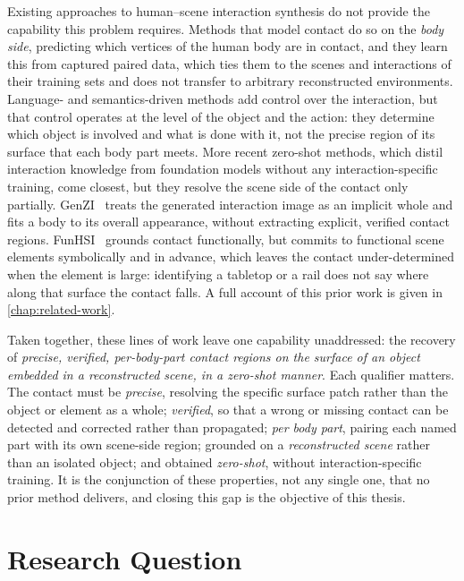 Existing approaches to human--scene interaction synthesis do not provide the capability this problem requires. Methods that model contact do so on the \emph{body side}, predicting which vertices of the human body are in contact, and they learn this from captured paired data, which ties them to the scenes and interactions of their training sets and does not transfer to arbitrary reconstructed environments. Language- and semantics-driven methods add control over the interaction, but that control operates at the level of the object and the action: they determine which object is involved and what is done with it, not the precise region of its surface that each body part meets. More recent zero-shot methods, which distil interaction knowledge from foundation models without any interaction-specific training, come closest, but they resolve the scene side of the contact only partially. GenZI~\cite{li2024genzi} treats the generated interaction image as an implicit whole and fits a body to its overall appearance, without extracting explicit, verified contact regions. FunHSI~\cite{liu2026funhsi} grounds contact functionally, but commits to functional scene elements symbolically and in advance, which leaves the contact under-determined when the element is large: identifying a tabletop or a rail does not say where along that surface the contact falls. A full account of this prior work is given in \cref{chap:related-work}.

Taken together, these lines of work leave one capability unaddressed: the recovery of \emph{precise, verified, per-body-part contact regions on the surface of an object embedded in a reconstructed scene, in a zero-shot manner}. Each qualifier matters. The contact must be \emph{precise}, resolving the specific surface patch rather than the object or element as a whole; \emph{verified}, so that a wrong or missing contact can be detected and corrected rather than propagated; \emph{per body part}, pairing each named part with its own scene-side region; grounded on a \emph{reconstructed scene} rather than an isolated object; and obtained \emph{zero-shot}, without interaction-specific training. It is the conjunction of these properties, not any single one, that no prior method delivers, and closing this gap is the objective of this thesis.

\section{Research Question}
\label{sec:intro-rq}

